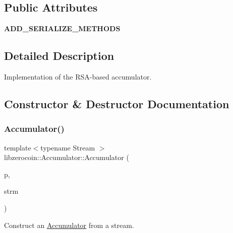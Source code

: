 \subsection*{Public Attributes}
\begin{DoxyCompactItemize}
\item 
\mbox{\label{classlibzerocoin_1_1_accumulator_ad90a9cdbbd70d2940dd61a85803b6d98}} 
{\bfseries A\+D\+D\+\_\+\+S\+E\+R\+I\+A\+L\+I\+Z\+E\+\_\+\+M\+E\+T\+H\+O\+DS}
\end{DoxyCompactItemize}


\subsection{Detailed Description}
Implementation of the R\+S\+A-\/based accumulator. 

\subsection{Constructor \& Destructor Documentation}
\mbox{\label{classlibzerocoin_1_1_accumulator_a215f60913d092b292e753b83da226723}} 
\subsubsection{\texorpdfstring{Accumulator()}{Accumulator()}\hspace{0.1cm}{\footnotesize\ttfamily [1/2]}}
{\footnotesize\ttfamily template$<$typename Stream $>$ \\
libzerocoin\+::\+Accumulator\+::\+Accumulator (\begin{DoxyParamCaption}\item[{const \mbox{\hyperlink{classlibzerocoin_1_1_accumulator_and_proof_params}{Accumulator\+And\+Proof\+Params}} $\ast$}]{p,  }\item[{Stream \&}]{strm }\end{DoxyParamCaption})\hspace{0.3cm}{\ttfamily [inline]}}



Construct an \mbox{\hyperlink{classlibzerocoin_1_1_accumulator}{Accumulator}} from a stream. 


